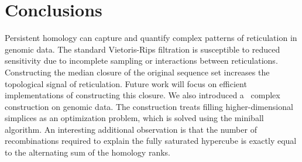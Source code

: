 
\section{Conclusions}
\label{complex_construction:conclusion}

Persistent homology can capture and quantify complex patterns of reticulation in genomic data.
The standard Vietoris-Rips filtration is susceptible to reduced sensitivity due to incomplete sampling or interactions between reticulations.
Constructing the median closure of the original sequence set increases the topological signal of reticulation.
Future work will focus on efficient implementations of constructing this closure.
We also introduced a \Cech\ complex construction on genomic data.
The construction treats filling higher-dimensional simplices as an optimization problem, which is solved using the miniball algorithm.
An interesting additional observation is that the number of recombinations required to explain the fully saturated hypercube is exactly equal to the alternating sum of the homology ranks.